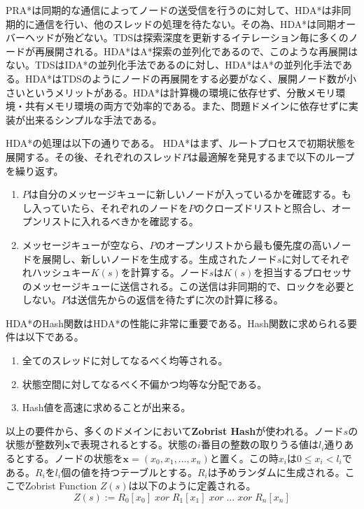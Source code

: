 \documentclass[uplatex]{jsarticle}
\begin{document}
PRA*は同期的な通信によってノードの送受信を行うのに対して、HDA*は非同期的に通信を行い、他のスレッドの処理を待たない。その為、HDA*は同期オーバーヘッドが殆どない。TDSは探索深度を更新するイテレーション毎に多くのノードが再展開される。HDA*はA*探索の並列化であるので、このような再展開はない。TDSはIDA*の並列化手法であるのに対し、HDA*はA*の並列化手法である。HDA*はTDSのようにノードの再展開をする必要がなく、展開ノード数が小さいというメリットがある。HDA*は計算機の環境に依存せず、分散メモリ環境・共有メモリ環境の両方で効率的である。また、問題ドメインに依存せずに実装が出来るシンプルな手法である。
\newline

HDA*の処理は以下の通りである。
HDA*はまず、ルートプロセスで初期状態を展開する。その後、それぞれのスレッド$P$は最適解を発見するまで以下のループを繰り返す。

\begin{enumerate}
	\item $P$は自分のメッセージキューに新しいノードが入っているかを確認する。もし入っていたら、それぞれのノードを$P$のクローズドリストと照合し、オープンリストに入れるべきかを確認する。
	\item メッセージキューが空なら、$P$のオープンリストから最も優先度の高いノードを展開し、新しいノードを生成する。生成されたノード$s$に対してそれぞれハッシュキー$K(s)$を計算する。ノード$s$は$K(s)$を担当するプロセッサのメッセージキューに送信される。この送信は非同期的で、ロックを必要としない。$P$は送信先からの返信を待たずに次の計算に移る。
\end{enumerate}

HDA*のHash関数はHDA*の性能に非常に重要である。Hash関数に求められる要件は以下である。

\begin{enumerate}
	\item 全てのスレッドに対してなるべく均等される。
	\item 状態空間に対してなるべく不偏かつ均等な分配である。
	\item Hash値を高速に求めることが出来る。
\end{enumerate}

以上の要件から、多くのドメインにおいて\textbf{Zobrist Hash}が使われる\cite{Zobrist1970}。ノード$s$の状態が整数列$\mathbf{x}$で表現されるとする。状態の$i$番目の整数の取りうる値は$l_{i}$通りあるとする。ノードの状態を$\mathbf{x} = (x_{0}, x_{1}, …, x_{n})$と置く。この時$x_{i}$は$0 \leq x_{i} < l_{i}$である。$R_{i}$を$l_{i}$個の値を持つテーブルとする。$R_{i}$は予めランダムに生成される。ここでZobrist Function $Z(s)$は以下のように定義される。
\newline
\begin{equation}
	Z(s) := R_{0}[x_{0}]\; xor\; R_{1}[x_{1}]\; xor\; …\; xor\; R_{n}[x_{n}]%
\end{equation}
\end{document}
